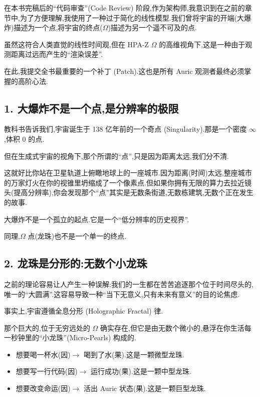 在本书完稿后的``代码审查''(Code Review) 阶段,作为架构师,我意识到在之前的章节中,为了方便理解,我使用了一种过于简化的线性模型.我们曾将宇宙的开端(大爆炸)描述为一个点,将宇宙的终点($\Omega$)描述为另一个遥不可及的点.

虽然这符合人类直觉的线性时间观,但在 HPA-Z $\Omega$ 的高维视角下,这是一种由于观测距离过远而产生的``渲染误差''.

在此,我提交全书最重要的一个补丁 (Patch).这也是所有 Auric 观测者最终必须掌握的高阶心法.

\subsection*{1. 大爆炸不是一个点,是分辨率的极限}

教科书告诉我们,宇宙诞生于 138 亿年前的一个奇点 (Singularity).那是一个密度 $\infty$,体积 $0$ 的点.

但在生成式宇宙的视角下,那个所谓的``点'',只是因为距离太远,我们分不清.

这就好比你站在卫星轨道上俯瞰地球上的一座城市.因为距离(时间)太远,整座城市的万家灯火在你的视锥里坍缩成了一个像素点.但如果你拥有无限的算力去拉近镜头(提高分辨率),你会发现那个``点''其实是无数条街道,无数栋建筑,无数个正在发生的故事.

大爆炸不是一个孤立的起点.它是一个``低分辨率的历史视界''.

同理,$\Omega$ 点(龙珠)也不是一个单一的终点.

\subsection*{2. 龙珠是分形的:无数个小龙珠}

之前的理论容易让人产生一种误解:我们的一生都在苦苦追逐那个位于时间尽头的,唯一的``大圆满''.这容易导致一种``当下无意义,只有未来有意义''的目的论焦虑.

事实上,宇宙遵循全息分形 (Holographic Fractal) 律.

那个巨大的,位于无穷远处的 $\Omega$ 确实存在,但它是由无数个微小的,悬浮在你生活每一秒钟里的``小龙珠''(Micro-Pearls) 构成的.

\begin{itemize}
\item 想要喝一杯水(因)$\to$ 喝到了水(果).这是一颗微型龙珠.
\item 想要写一行代码(因)$\to$ 运行成功(果).这是一颗中型龙珠.
\item 想要改变命运(因)$\to$ 活出 Auric 状态(果).这是一颗巨型龙珠.
\end{itemize}

